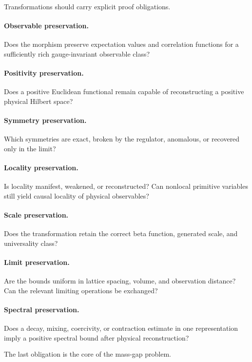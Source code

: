 \documentclass[11pt]{article}
\begin{document}
Transformations should carry explicit proof obligations.

\paragraph{Observable preservation.}
Does the morphism preserve expectation values and correlation functions for a
sufficiently rich gauge-invariant observable class?

\paragraph{Positivity preservation.}
Does a positive Euclidean functional remain capable of reconstructing a
positive physical Hilbert space?

\paragraph{Symmetry preservation.}
Which symmetries are exact, broken by the regulator, anomalous, or recovered
only in the limit?

\paragraph{Locality preservation.}
Is locality manifest, weakened, or reconstructed?  Can nonlocal primitive
variables still yield causal locality of physical observables?

\paragraph{Scale preservation.}
Does the transformation retain the correct beta function, generated scale,
and universality class?

\paragraph{Limit preservation.}
Are the bounds uniform in lattice spacing, volume, and observation distance?
Can the relevant limiting operations be exchanged?

\paragraph{Spectral preservation.}
Does a decay, mixing, coercivity, or contraction estimate in one representation
imply a positive spectral bound after physical reconstruction?

The last obligation is the core of the mass-gap problem.
\end{document}
